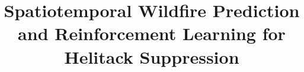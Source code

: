 \documentclass[conference]{IEEEtran}
\begin{document}
\title{Spatiotemporal Wildfire Prediction and Reinforcement Learning for Helitack Suppression}





\author{
}

\end{document}
